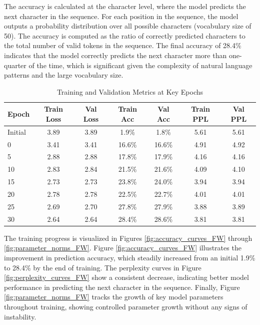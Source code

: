 \documentclass{article}
\begin{document}
\begin{itemize}
    The accuracy is calculated at the character level, where the model predicts the next character in the sequence. For each position in the sequence, the model outputs a probability distribution over all possible characters (vocabulary size of 50). The accuracy is computed as the ratio of correctly predicted characters to the total number of valid tokens in the sequence. The final accuracy of 28.4\% indicates that the model correctly predicts the next character more than one-quarter of the time, which is significant given the complexity of natural language patterns and the large vocabulary size.
\end{itemize}

\begin{table}[h]
\centering
\caption{Training and Validation Metrics at Key Epochs}
\begin{tabular}{lcccccc}
\toprule
Epoch & Train Loss & Val Loss & Train Acc & Val Acc & Train PPL & Val PPL \\
\midrule
Initial & 3.89 & 3.89 & 1.9\% & 1.8\% & 5.61 & 5.61 \\
0 & 3.41 & 3.41 & 16.6\% & 16.6\% & 4.91 & 4.92 \\
5 & 2.88 & 2.88 & 17.8\% & 17.9\% & 4.16 & 4.16 \\
10 & 2.83 & 2.84 & 21.5\% & 21.6\% & 4.09 & 4.10 \\
15 & 2.73 & 2.73 & 23.8\% & 24.0\% & 3.94 & 3.94 \\
20 & 2.78 & 2.78 & 22.5\% & 22.7\% & 4.01 & 4.01 \\
25 & 2.69 & 2.70 & 27.8\% & 27.9\% & 3.88 & 3.89 \\
30 & 2.64 & 2.64 & 28.4\% & 28.6\% & 3.81 & 3.81 \\
\bottomrule
\end{tabular}
\label{tab:training_metrics}
\end{table}

The training progress is visualized in Figures \ref{fig:accuracy_curves_FW} through \ref{fig:parameter_norms_FW}. Figure \ref{fig:accuracy_curves_FW} illustrates the improvement in prediction accuracy, which steadily increased from an initial 1.9\% to 28.4\% by the end of training. The perplexity curves in Figure \ref{fig:perplexity_curves_FW} show a consistent decrease, indicating better model performance in predicting the next character in the sequence. Finally, Figure \ref{fig:parameter_norms_FW} tracks the growth of key model parameters throughout training, showing controlled parameter growth without any signs of instability.
\end{document}
